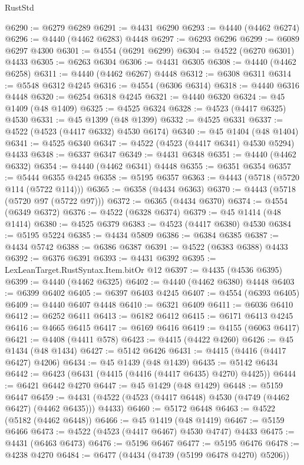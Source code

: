 \begin{lexlean}{RustStd}
\begin{coremodule}
@6290 := @6279 @6289
@6291 := @4431 @6290
@6293 := @4440 (@4462 @6274)
@6296 := @4440 (@4462 @6283) @4448
@6297 := @6293 @6296
@6299 := @6089 @6297 @4300
@6301 := @4554 (@6291 @6299)
@6304 := @4522 (@6270 @6301) @4433
@6305 := @6263 @6304
@6306 := @4431 @6305
@6308 := @4440 (@4462 @6258)
@6311 := @4440 (@4462 @6267) @4448
@6312 := @6308 @6311
@6314 := @5548 @6312 @4245
@6316 := @4554 (@6306 @6314)
@6318 := @4440 @6316 @4448
@6320 := @6254 @6318 @4245
@6321 := @4440 @6320
@6324 := @45 @1409 (@48 @1409)
@6325 := @4525 @6324
@6328 := @4523 (@4417 @6325) @4530
@6331 := @45 @1399 (@48 @1399)
@6332 := @4525 @6331
@6337 := @4522 (@4523 (@4417 @6332) @4530 @6174)
@6340 := @45 @1404 (@48 @1404)
@6341 := @4525 @6340
@6347 := @4522 (@4523 (@4417 @6341) @4530 @5294) @4433
@6348 := @6337 @6347
@6349 := @4431 @6348
@6351 := @4440 (@4462 @6332)
@6354 := @4440 (@4462 @6341) @4448
@6355 := @6351 @6354
@6357 := @5444 @6355 @4245
@6358 := @5195 @6357
@6363 := @4443 (@5718 (@5720 @114 (@5722 @114)))
@6365 := @6358 (@4434 @6363)
@6370 := @4443 (@5718 (@5720 @97 (@5722 @97)))
@6372 := @6365 (@4434 @6370)
@6374 := @4554 (@6349 @6372)
@6376 := @4522 (@6328 @6374)
@6379 := @45 @1414 (@48 @1414)
@6380 := @4525 @6379
@6383 := @4523 (@4417 @6380) @4530
@6384 := @5195 @5224
@6385 := @4434 @5809
@6386 := @6384 @6385
@6387 := @4434 @5742
@6388 := @6386 @6387
@6391 := @4522 (@6383 @6388) @4433
@6392 := @6376 @6391
@6393 := @4431 @6392
@6395 := LexLeanTarget.RustSyntax.Item.bitOr @12
@6397 := @4435 (@4536 @6395)
@6399 := @4440 (@4462 @6325)
@6402 := @4440 (@4462 @6380) @4448
@6403 := @6399 @6402
@6405 := @6397 @6403 @4245
@6407 := @4554 (@6393 @6405)
@6409 := @4440 @6407 @4448
@6410 := @6321 @6409
@6411 := @6036 @6410
@6412 := @6252 @6411
@6413 := @6182 @6412
@6415 := @6171 @6413 @4245
@6416 := @4665 @6415
@6417 := @6169 @6416
@6419 := @4155 (@6063 @6417)
@6421 := @4408 (@4411 @578)
@6423 := @4415 (@4422 @4260)
@6426 := @45 @1434 (@48 @1434)
@6427 := @5142 @6426
@6431 := @4415 (@4416 (@4417 @6427) @4206)
@6434 := @45 @1439 (@48 @1439)
@6435 := @5142 @6434
@6442 := @6423 (@6431 (@4415 (@4416 (@4417 @6435) @4270) @4425))
@6444 := @6421 @6442 @4270
@6447 := @45 @1429 (@48 @1429)
@6448 := @5159 @6447
@6459 := @4431 (@4522 (@4523 (@4417 @6448) @4530 (@4749 (@4462 @6427) (@4462 @6435))) @4433)
@6460 := @5172 @6448
@6463 := @4522 (@5182 (@4462 @6448))
@6466 := @45 @1419 (@48 @1419)
@6467 := @5159 @6466
@6473 := @4522 (@4523 (@4417 @6467) @4530 @4747) @4433
@6475 := @4431 (@6463 @6473)
@6476 := @5196 @6467
@6477 := @5195 @6476
@6478 := @4238 @4270
@6484 := @6477 (@4434 (@4739 (@5199 @6478 @4270) @5206))

\end{coremodule}
\end{lexlean}
